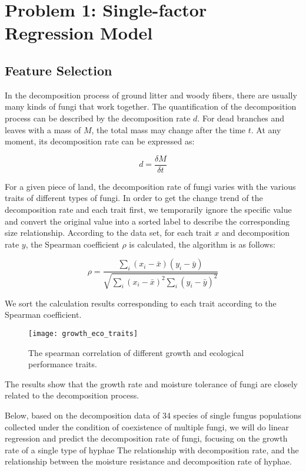 \documentclass{mcmthesis}
\begin{document}
\section{Problem 1: Single-factor Regression Model}

\subsection{Feature Selection}

In the decomposition process of ground litter and woody fibers, there are usually many kinds of fungi that work together. The quantification of the decomposition process can be described by the decomposition rate $ d $. For dead branches and leaves with a mass of $ M $, the total mass may change after the time $ t $. At any moment, its decomposition rate can be expressed as: 

\begin{equation}
  d=\frac{\delta M}{\delta t}
\end{equation}

For a given piece of land, the decomposition rate of fungi varies with the various traits of different types of fungi. In order to get the change trend of the decomposition rate and each trait first, we temporarily ignore the specific value and convert the original value into a sorted label to describe the corresponding size relationship. According to the data set, for each trait $ x $ and decomposition rate $ y $, the Spearman coefficient $ \rho $ is calculated, the algorithm is as follows: 

\begin{equation}
  \rho=\frac{\sum_{i}\left(x_{i}-\bar{x}\right)\left(y_{i}-\bar{y}\right)}{\sqrt{\sum_{i}\left(x_{i}-\bar{x}\right)^{2} \sum_{i}\left(y_{i}-\bar{y}\right)^{2}}}
\end{equation}

We sort the calculation results corresponding to each trait according to the Spearman coefficient. 

\begin{figure}[H]
  \small
  \centering
  \texttt{[image: growth\_eco\_traits]}
  \caption{The spearman correlation of different growth and ecological performance traits.}
  \label{growth_eco_traits}
\end{figure}

The results show that the growth rate and moisture tolerance of fungi are closely related to the decomposition process. 

Below, based on the decomposition data of 34 species of single fungus populations collected under the condition of coexistence of multiple fungi, we will do linear regression and predict the decomposition rate of fungi, focusing on the growth rate of a single type of hyphae The relationship with decomposition rate, and the relationship between the moisture resistance and decomposition rate of hyphae. 
\end{document}
